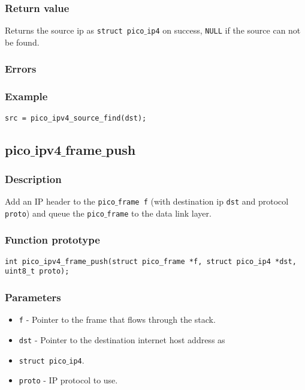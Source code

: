 \subsubsection*{Return value}
Returns the source ip as \texttt{struct pico$\_$ip4} on success, \texttt{NULL} if the source can not be found.

\subsubsection*{Errors}

\subsubsection*{Example}
\begin{verbatim}
src = pico_ipv4_source_find(dst);
\end{verbatim}



\subsection{pico$\_$ipv4$\_$frame$\_$push}

\subsubsection*{Description}
Add an IP header to the \texttt{pico$\_$frame f} (with destination ip \texttt{dst} and protocol
\texttt{proto}) and queue the \texttt{pico$\_$frame} to the data link layer.

\subsubsection*{Function prototype}
\begin{verbatim}
int pico_ipv4_frame_push(struct pico_frame *f, struct pico_ip4 *dst, uint8_t proto);
\end{verbatim}

\subsubsection*{Parameters}
\begin{itemize}
\item \texttt{f} - Pointer to the frame that flows through the stack.
\item \texttt{dst} - Pointer to the destination internet host address as \item \texttt{struct pico$\_$ip4}.
\item \texttt{proto} - IP protocol to use. 
\end{itemize}

